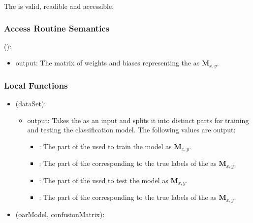 \documentclass[12pt, titlepage]{article}
\begin{document}
The  is valid, readible and accessible.

\subsubsection{Access Routine Semantics}

\noindent {}():
\begin{itemize}
\item output: The matrix of weights and biases representing the  as $\mathbf{M}_{x,y}$.
\end{itemize}

\subsubsection{Local Functions}

\begin{itemize}
\item {}(dataSet):
  \begin{itemize}
    \item output: Takes the  as an input and splits it into distinct parts for training and testing the classification model.
    The following values are output:
    \begin{itemize}
      \item {}: The part of the  used to train the model as $\mathbf{M}_{x,y}$.
      \item {}: The part of the  corresponding to the true labels of the  as $\mathbf{M}_{x,y}$.
      \item {}: The part of the  used to test the model as $\mathbf{M}_{x,y}$.
      \item {}: The part of the  corresponding to the true labels of the  as $\mathbf{M}_{x,y}$.
    \end{itemize}
  \end{itemize}
\item {}(oarModel, confusionMatrix):
\end{itemize}
\end{document}
